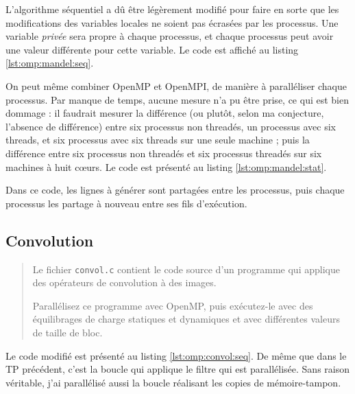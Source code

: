L'algorithme séquentiel a dû être légèrement modifié pour faire en
sorte que les modifications des variables locales ne soient pas
écrasées par les processus. Une variable \emph{privée} sera propre à
chaque processus, et chaque processus peut avoir une valeur différente
pour cette variable. Le code est affiché au listing
\ref{lst:omp:mandel:seq}.



On peut même combiner OpenMP et OpenMPI, de manière à paralléliser
chaque processus. Par manque de temps, aucune mesure n'a pu être
prise, ce qui est bien dommage : il faudrait mesurer la différence (ou
plutôt, selon ma conjecture, l'absence de différence) entre six
processus non threadés, un processus avec six threads, et six
processus avec six threads sur une seule machine ; puis la différence
entre six processus non threadés et six processus threadés sur six
machines à huit cœurs. Le code est présenté au listing
\ref{lst:omp:mandel:stat}.



Dans ce code, les lignes à générer sont partagées entre les processus,
puis chaque processus les partage à nouveau entre ses fils d'exécution.



\subsection{Convolution}

\begin{quotation}
  Le fichier \texttt{convol.c} contient le code source d'un programme
  qui applique des opérateurs de convolution à des images.

  Parallélisez ce programme avec OpenMP, puis exécutez-le avec des
  équilibrages de charge statiques et dynamiques et avec différentes
  valeurs de taille de bloc.
\end{quotation}

Le code modifié est présenté au listing \ref{lst:omp:convol:seq}. De
même que dans le TP précédent, c'est la boucle qui applique le filtre
qui est parallélisée. Sans raison véritable, j'ai parallélisé aussi la
boucle réalisant les copies de mémoire-tampon.



